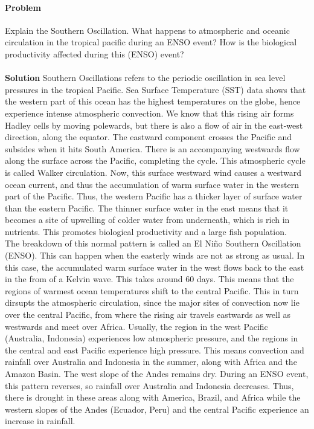 \documentclass[10pt]{article}
\newcounter{prob}
\def\problem{\stepcounter{prob}\paragraph{Problem \arabic{prob}}}
\def\solution{\\\\\textbf{Solution }}
\begin{document}
        \problem Explain the Southern Oscillation.
        What happens to atmospheric and oceanic circulation in the tropical pacific during an ENSO event?
        How is the biological productivity affected during this (ENSO) event?
        \solution Southern Oscillations refers to the periodic oscillation in sea level pressures in the tropical Pacific.
        Sea Surface Temperature (SST) data shows that the western part of this ocean has the highest temperatures on the globe, hence
        experience intense atmospheric convection. We know that this rising air forms Hadley cells by moving polewards, but there is also a
        flow of air in the east-west direction, along the equator. The eastward component crosses the Pacific and subsides when it
        hits South America. There is an accompanying westwards flow along the surface across the Pacific, completing the cycle. This
        atmospheric cycle is called Walker circulation. Now, this surface westward wind causes a westward ocean current, and thus the
        accumulation of warm surface water in the western part of the Pacific. Thus, the western Pacific has a thicker layer
        of surface water than the eastern Pacific. The thinner surface water in the east means that it becomes a site of upwelling of
        colder water from underneath, which is rich in nutrients. This promotes biological productivity and a large fish population. \\

        The breakdown of this normal pattern is called an El Ni\~{n}o Southern Oscillation (ENSO). This can happen when the easterly winds are not
        as strong as usual. In this case, the accumulated warm surface water in the west flows back to the east in the from of a Kelvin wave.
        This takes around 60 days. This means that the regions of warmest ocean temperatures shift to the central Pacific. This in turn
        dirsupts the atmospheric circulation, since the major sites of convection now lie over the central Pacific, from where the rising air travels
        eastwards as well as westwards and meet over Africa. Usually, the region in the west Pacific (Australia, Indonesia) experiences
        low atmospheric pressure, and the regions in the central and east Pacific experience high pressure. This means convection and rainfall
        over Australia and Indonesia in the summer, along with Africa and the Amazon Basin. The west slope of the Andes remains dry.
        During an ENSO event, this pattern reverses, so rainfall over Australia and Indonesia decreases. Thus, there is drought in these
        areas along with America, Brazil, and Africa while the western slopes of the Andes (Ecuador, Peru) and the central Pacific experience
        an increase in rainfall. \\
\end{document}
